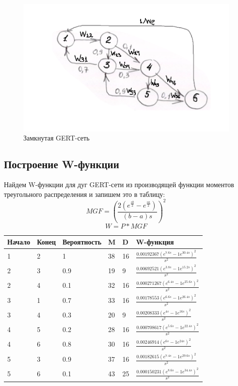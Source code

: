 \documentclass[14pt,a4paper,report]{report}
\begin{document}
\begin{figure}[h!]
	\centering
	\includegraphics[scale = 0.65]{images/1.png}
	\caption{Замкнутая GERT-сеть}
	\label{image:1}
\end{figure}

\subsection{Построение W-функции}

Найдем W-функции для дуг GERT-сети из производящей функции моментов треугольного распределения и запишем это в таблицу:
$$ MGF = (\frac{2(e^{\frac{sb}{2}}-e^{\frac{sa}{2}})}{(b-a)s})^2 $$
$$ W = P * MGF  $$
\begin{table}[h!]
	\center
	\bgroup
	\def\arraystretch{1}
	\begin{tabular}{ | m{1.5cm} | m{1.5cm} | m{2.0cm} | m{1.0cm} | m{1.0cm} | m{5.0cm} | }
		\hline
		Начало & Конец & Вероятность & M & D & W-функция \\ \hline
		1 	&  2 	& 1 			& 38 	& 16 	& $\frac{0.00192367 (e^{7.6 s} - 1 e^{30.4 s})^2}{s^2}$ \\ \hline
		2	& 3 	& 0.9 		& 19 	& 9 		& $\frac{0.00692521 (e^{3.8 s} - 1 e^{15.2 s})^2}{s^2}$ \\ \hline
		2 	& 4 	& 0.1  		& 32 	& 16 	& $\frac{0.000271267 (e^{6.4 s} - 1 e^{25.6 s})^2}{s^2}$ \\ \hline
		3 	& 1 	& 0.7 		& 33 	& 16 	& $\frac{0.00178553 (e^{6.6 s} - 1 e^{26.4 s})^2}{s^2}$ \\ \hline
		3 	& 4 	& 0.3 		& 20 	& 9 		& $\frac{0.00208333 (e^{4 s} - 1 e^{16 s})^2}{s^2}$ \\ \hline
		4 	& 5 	& 0.2 			& 28 	& 16 	& $\frac{0.000708617 (e^{5.6 s} - 1 e^{22.4 s})^2}{s^2}$ \\ \hline
		4 	& 6 	& 0.8 			& 30 	& 16 	& $\frac{0.00246914 (e^{6 s} - 1 e^{24 s})^2}{s^2}$ \\ \hline
		5 	& 3 	& 0.9 		& 37 	& 16 	& $\frac{0.00182615 (e^{7.4 s} - 1 e^{29.6 s})^2}{s^2}$ \\ \hline
		5 	& 6 	& 0.1 		& 43 	& 25 	& $\frac{0.000150231 (e^{8.6 s} - 1 e^{34.4 s})^2}{s^2}$ \\ \hline
	\end{tabular}
	\egroup
\end{table}
\end{document}
